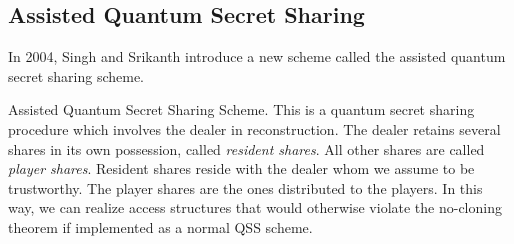 


\subsection{Assisted Quantum Secret Sharing}
\label{ssec:aqss}

In 2004, Singh and Srikanth introduce a new scheme called the assisted quantum secret sharing scheme. 

\begin{definition}{Assisted Quantum Secret Sharing Scheme.}
    \label{defn:aqss}
    This is a quantum secret sharing procedure which involves the dealer in reconstruction. The dealer retains several shares in its own possession, called \textit{resident shares}. All other shares are called \textit{player shares}. Resident shares reside with the dealer whom we assume to be trustworthy. The player shares are the ones distributed to the players. In this way, we can realize access structures that would otherwise violate the no-cloning theorem if implemented as a normal QSS scheme. 
\end{definition}


